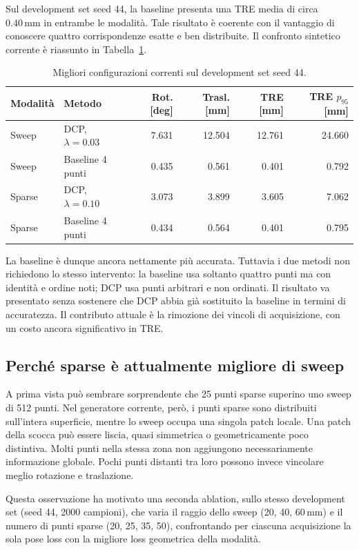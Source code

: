 \documentclass[11pt,a4paper]{article}
\newcommand{\SI}[2]{\ensuremath{#1\,#2}}
\newcommand{\milli}{\mathrm{m}}
\newcommand{\metre}{\mathrm{m}}
\begin{document}
Sul development set seed 44, la baseline presenta una TRE media di circa
\SI{0.40}{\milli\metre} in entrambe le modalità. Tale risultato è coerente con
il vantaggio di conoscere quattro corrispondenze esatte e ben distribuite. Il
confronto sintetico corrente è riassunto in Tabella~\ref{tab:best-dev}.

\begin{table}[ht]
\centering
\caption{Migliori configurazioni correnti sul development set seed 44.}
\label{tab:best-dev}
\begin{tabular}{llrrrr}
\toprule
Modalità & Metodo & Rot. [deg] & Trasl. [mm] & TRE [mm] & TRE $p_{95}$ [mm] \\
\midrule
Sweep & DCP, $\lambda=0.03$ & 7.631 & 12.504 & 12.761 & 24.660 \\
Sweep & Baseline 4 punti & 0.435 & 0.561 & 0.401 & 0.792 \\
Sparse & DCP, $\lambda=0.10$ & 3.073 & 3.899 & 3.605 & 7.062 \\
Sparse & Baseline 4 punti & 0.434 & 0.564 & 0.401 & 0.795 \\
\bottomrule
\end{tabular}
\end{table}

La baseline è dunque ancora nettamente più accurata. Tuttavia i due metodi non
richiedono lo stesso intervento: la baseline usa soltanto quattro punti ma con
identità e ordine noti; DCP usa punti arbitrari e non ordinati. Il risultato va
presentato senza sostenere che DCP abbia già sostituito la baseline in termini
di accuratezza. Il contributo attuale è la rimozione dei vincoli di
acquisizione, con un costo ancora significativo in TRE.

\subsection{Perché sparse è attualmente migliore di sweep}

A prima vista può sembrare sorprendente che 25 punti sparse superino uno sweep
di 512 punti. Nel generatore corrente, però, i punti sparse sono distribuiti
sull'intera superficie, mentre lo sweep occupa una singola patch locale. Una
patch della scocca può essere liscia, quasi simmetrica o geometricamente poco
distintiva. Molti punti nella stessa zona non aggiungono necessariamente
informazione globale. Pochi punti distanti tra loro possono invece vincolare
meglio rotazione e traslazione.

Questa osservazione ha motivato una seconda ablation, sullo stesso
development set (seed 44, 2000 campioni), che varia il raggio dello sweep
(20, 40, \SI{60}{\milli\metre}) e il numero di punti sparse (20, 25, 35, 50),
confrontando per ciascuna acquisizione la sola pose loss con la migliore
loss geometrica della modalità.
\end{document}
